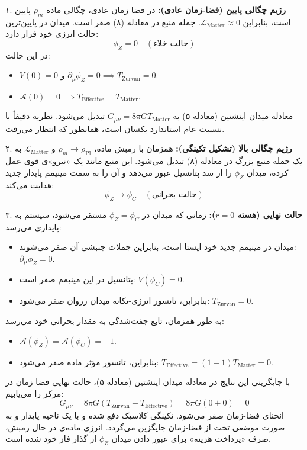 \documentclass[12pt, a4paper]{article}
\newcommand{\phiZ}{\phi_Z}
\newcommand{\Lmat}{\mathcal{L}_{\text{Matter}}}
\newcommand{\Tmat}{T_{\text{Matter}}}
\newcommand{\Teff}{T_{\text{Effective}}}
\newcommand{\Tzurvan}{T_{\text{Zurvan}}}
\newcommand{\Aphi}{\mathcal{A}(\phiZ)}
\newcommand{\phiC}{\phi_C}
\newcommand{\rhopl}{\rho_{\text{Pl}}}
\begin{document}
\noindent ۱. \textbf{رژیم چگالی پایین (فضا-زمان عادی):}
در فضا-زمان عادی، چگالی ماده $\rho_m$ پایین است، بنابراین $\Lmat \approx 0$. جمله منبع در معادله (۸) صفر است. میدان در پایین‌ترین حالت انرژی خود قرار دارد:
$$ \phiZ = 0 \quad (\text{حالت خلاء}) $$
در این حالت:
\begin{itemize}
    \item $V(0) = 0$ و $\partial_\mu \phiZ = 0 \implies \Tzurvan = 0$.
    \item $\mathcal{A}(0) = 0 \implies \Teff = \Tmat$.
\end{itemize}
معادله میدان اینشتین (معادله ۵) به $G_{\mu\nu} = 8\pi G \Tmat$ تبدیل می‌شود. نظریه دقیقاً با نسبیت عام استاندارد یکسان است، همانطور که انتظار می‌رفت.

\noindent ۲. \textbf{رژیم چگالی بالا (تشکیل تکینگی):}
همزمان با رمبش ماده، $\rho_m \to \rhopl$ و $\Lmat$ به یک جمله منبع بزرگ در معادله (۸) تبدیل می‌شود. این منبع مانند یک «نیرو»ی قوی عمل کرده، میدان $\phiZ$ را از سد پتانسیل عبور می‌دهد و آن را به سمت مینیمم پایدار جدید هدایت می‌کند:
$$ \phiZ \to \phiC \quad (\text{حالت بحرانی}) $$

\noindent ۳. \textbf{حالت نهایی (هسته $r=0$):}
زمانی که میدان در $\phiZ = \phiC$ مستقر می‌شود، سیستم به پایداری می‌رسد:
\begin{itemize}
    \item میدان در مینیمم جدید خود ایستا است، بنابراین جملات جنبشی آن صفر می‌شوند: $\partial_\mu \phiZ = 0$.
    \item پتانسیل در این مینیمم صفر است: $V(\phiC) = 0$.
    \item بنابراین، تانسور انرژی-تکانه میدان زروان صفر می‌شود: $\Tzurvan = 0$.
\end{itemize}
به طور همزمان، تابع جفت‌شدگی به مقدار بحرانی خود می‌رسد:
\begin{itemize}
    \item $\Aphi = \mathcal{A}(\phiC) = -1$.
    \item بنابراین، تانسور مؤثر ماده صفر می‌شود: $\Teff = (1 - 1) \Tmat = 0$.
\end{itemize}
با جایگزینی این نتایج در معادله میدان اینشتین (معادله ۵)، حالت نهایی فضا-زمان در مرکز را می‌یابیم:
\begin{equation}
G_{\mu\nu} = 8\pi G (\Tzurvan + \Teff) = 8\pi G (0 + 0) = 0
\end{equation}
انحنای فضا-زمان صفر می‌شود. تکینگی کلاسیک دفع شده و با یک ناحیه پایدار و به صورت موضعی تخت از فضا-زمان جایگزین می‌گردد. انرژی ماده‌ی در حال رمبش، صرف «پرداخت هزینه» برای عبور دادن میدان $\phiZ$ از گذار فاز خود شده است.
\end{document}
